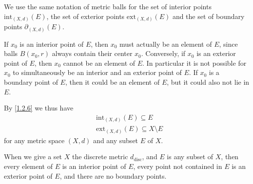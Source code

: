 \begin{note}
  We use the same notation of metric balls for the set of interior points \(\text{int}_{(X, d)}(E)\), the set of exterior points \(\text{ext}_{(X, d)}(E)\) and the set of boundary points \(\partial_{(X, d)}(E)\).
\end{note}

\begin{rmk}\label{1.2.6}
  If \(x_0\) is an interior point of \(E\), then \(x_0\) must actually be an element of \(E\), since balls \(B(x_0, r)\) always contain their center \(x_0\).
  Conversely, if \(x_0\) is an exterior point of \(E\), then \(x_0\) cannot be an element of \(E\).
  In particular it is not possible for \(x_0\) to simultaneously be an interior and an exterior point of \(E\).
  If \(x_0\) is a boundary point of \(E\), then it could be an element of \(E\), but it could also not lie in \(E\).
\end{rmk}

\begin{note}
  By \cref{1.2.6} we thus have
  \begin{align*}
     & \text{int}_{(X, d)}(E) \subseteq E             \\
     & \text{ext}_{(X, d)}(E) \subseteq X \setminus E
  \end{align*}
  for any metric space \((X, d)\) and any subset \(E\) of \(X\).
\end{note}

\setcounter{thm}{7}
\begin{eg}\label{1.2.8}
  When we give a set \(X\) the discrete metric \(d_{\text{disc}}\), and \(E\) is any subset of \(X\), then every element of \(E\) is an interior point of \(E\), every point not contained in \(E\) is an exterior point of \(E\), and there are no boundary points.
\end{eg}

